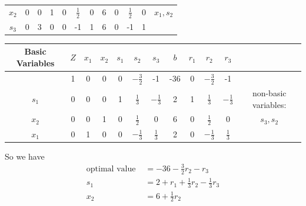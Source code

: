 \begin{enumerate}
\begin{center}
\begin{tabular}{|c|c|c c c c c|c|c c c|c|}
                  \(x_2\)         & 0     & 0       & 1       & 0       & \(\frac{1}{2}\)  & 0       & 6     & 0       & \(\frac{1}{2}\)   & 0       & \(x_1, s_2\)         \\
                  \(s_3\)         & 0     & 3       & 0       & 0       & -1               & 1       & 6     & 0       & -1                & 1       &                      \\
                  \hline
              \end{tabular}
          \end{center}
          \begin{center}
              \begin{tabular}{|c|c|c c c c c|c|c c c|c|}
                  \hline
                  Basic Variables & \(Z\) & \(x_1\) & \(x_2\) & \(s_1\) & \(s_2\)          & \(s_3\)          & \(b\) & \(r_1\) & \(r_2\)          & \(r_3\)          &                      \\
                  \hline
                                  & 1     & 0       & 0       & 0       & \(-\frac{3}{2}\) & -1               & -36   & 0       & \(-\frac{3}{2}\) & -1               &                      \\
                  \hline
                  \(s_1\)         & 0     & 0       & 0       & 1       & \(\frac{1}{3}\)  & \(-\frac{1}{3}\) & 2     & 1       & \(\frac{1}{3}\)  & \(-\frac{1}{3}\) & non-basic variables: \\
                  \(x_2\)         & 0     & 0       & 1       & 0       & \(\frac{1}{2}\)  & 0                & 6     & 0       & \(\frac{1}{2}\)  & 0                & \(s_3, s_2\)         \\
                  \(x_1\)         & 0     & 1       & 0       & 0       & \(-\frac{1}{3}\) & \(\frac{1}{3}\)  & 2     & 0       & \(-\frac{1}{3}\) & \(\frac{1}{3}\)  &                      \\
                  \hline
              \end{tabular}
          \end{center}
          So we have
          \begin{align*}
              \text{optimal value } & = -36 - \frac{3}{2}r_2 - r_3                \\
              s_1                   & = 2 + r_1 + \frac{1}{3}r_2 - \frac{1}{3}r_3 \\
              x_2                   & = 6 + \frac{1}{2}r_2                        \\

\end{align*}
\end{enumerate}
